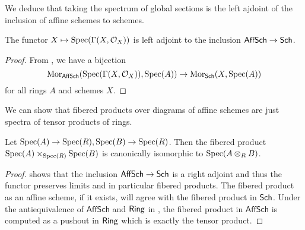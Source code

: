 We deduce that taking the spectrum of global sections is the left ajdoint of the inclusion of affine schemes to schemes. 
\begin{corollary}\label{corr: spectra of global sections is left adjoint of the inclusion}
    The functor $X\mapsto\operatorname{Spec}(\Gamma(X,\mathcal{O}_{X}))$ is left adjoint to the inclusion $\mathsf{AffSch}\to\mathsf{Sch}$. 
\end{corollary}
\begin{proof}
    From , we have a bijection $$\mathrm{Mor}_{\mathsf{AffSch}}(\operatorname{Spec}(\Gamma(X,\mathcal{O}_{X})),\operatorname{Spec}(A))\to\mathrm{Mor}_{\mathsf{Sch}}(X,\operatorname{Spec}(A))$$
    for all rings $A$ and schemes $X$.  
\end{proof}
We can show that fibered products over diagrams of affine schemes are just spectra of tensor products of rings. 
\begin{proposition}\label{prop: fibered products of affine schemes}
    Let $\operatorname{Spec}(A)\to\operatorname{Spec}(R),\operatorname{Spec}(B)\to\operatorname{Spec}(R)$. Then the fibered product $\operatorname{Spec}(A)\times_{\operatorname{Spec}(R)}\operatorname{Spec}(B)$ is canonically isomorphic to $\operatorname{Spec}(A\otimes_{R}B)$. 
\end{proposition}
\begin{proof}
     shows that the inclusion $\mathsf{AffSch}\to\mathsf{Sch}$ is a right adjoint and thus the functor preserves limits and in particular fibered products. The fibered product as an affine scheme, if it exists, will agree with the fibered product in $\mathsf{Sch}$. Under the antiequivalence of $\mathsf{AffSch}$ and $\mathsf{Ring}$ in , the fibered product in $\mathsf{AffSch}$ is computed as a pushout in $\mathsf{Ring}$ which is exactly the tensor product. 
\end{proof}
